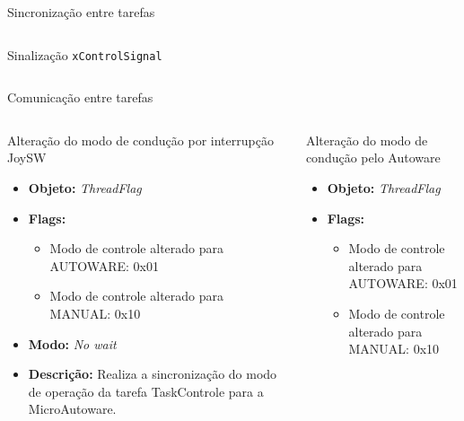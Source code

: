 \documentclass{if-beamer}
\begin{document}
\begin{frame}{Sincronização entre tarefas}
\begin{columns}
\begin{column}{0.5\textwidth}
\begin{block}{Sinalização \texttt{xControlSignal}}
\begin{itemize}
				\end{itemize}	
				
			\end{block}
			
		\end{column}
		
	\end{columns}
	
\end{frame}

\begin{frame}{Comunicação entre tarefas}

	\begin{columns}
	
	\begin{column}{0.55\textwidth}
		
		\begin{block}{Alteração do modo de condução por interrupção JoySW}
			
			\begin{itemize}
				\item \textbf{Objeto:} \textit{ThreadFlag}
				\item \textbf{Flags:}
				\begin{itemize}
					\item Modo de controle alterado para AUTOWARE: 0x01
					\item Modo de controle alterado para MANUAL: 0x10
					
				\end{itemize}
				\item \textbf{Modo:} \textit{No wait}
				\item \textbf{Descrição:} Realiza a sincronização do modo de operação da tarefa TaskControle para a MicroAutoware.
				
			\end{itemize}
			
		\end{block}
		
		\pause
		
	\end{column}
	
	\begin{column}{0.55\textwidth}
		
		\begin{block}{Alteração do modo de condução pelo Autoware}
			
			\begin{itemize}
				\item \textbf{Objeto:} \textit{ThreadFlag}
				\item \textbf{Flags:}
				\begin{itemize}
					\item Modo de controle alterado para AUTOWARE: 0x01
					\item Modo de controle alterado para MANUAL: 0x10
					

\end{itemize}
\end{itemize}
\end{block}
\end{column}
\end{columns}
\end{frame}
\end{document}
